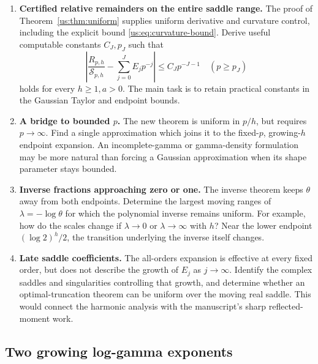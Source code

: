 \documentclass[11pt,a4paper]{article}
\numberwithin{equation}{section}
\theoremstyle{plain}
\theoremstyle{definition}
\theoremstyle{remark}
\begin{document}
\begin{enumerate}[leftmargin=*,label=H\arabic*.]
\item \textbf{Certified relative remainders on the entire saddle
range.} The proof of Theorem~\ref{us:thm:uniform} supplies uniform
derivative and curvature control, including the explicit bound
\eqref{us:eq:curvature-bound}. Derive useful computable constants
$C_J,p_J$ such that
\[
 \left|\frac{R_{p,h}}{\mathcal S_{p,h}}
      -\sum_{j=0}^JE_jp^{-j}\right|
 \le C_Jp^{-J-1}\quad(p\ge p_J)
\]
holds for every $h\ge1,a>0$. The main task is to retain practical
constants in the Gaussian Taylor and endpoint bounds.

\item \textbf{A bridge to bounded $p$.} The new theorem is uniform
in $p/h$, but requires $p\to\infty$. Find a single approximation
which joins it to the fixed-$p$, growing-$h$ endpoint expansion.
An incomplete-gamma or gamma-density formulation may be more
natural than forcing a Gaussian approximation when its shape
parameter stays bounded.

\item \textbf{Inverse fractions approaching zero or one.}
The inverse theorem keeps $\theta$ away from both endpoints.
Determine the largest moving ranges of
$\lambda=-\log\theta$ for which the polynomial inverse remains
uniform. For example, how do the scales change if
$\lambda\to0$ or $\lambda\to\infty$ with $h$? Near the lower
endpoint $(\log2)^h/2$, the transition underlying the inverse
itself changes.

\item \textbf{Late saddle coefficients.} The all-orders expansion
is effective at every fixed order, but does not describe the growth
of $E_j$ as $j\to\infty$. Identify the complex saddles and
singularities controlling that growth, and determine whether an
optimal-truncation theorem can be uniform over the moving real
saddle. This would connect the harmonic analysis with the
manuscript's sharp reflected-moment work.
\end{enumerate}

\subsection{Two growing log-gamma exponents}
\end{document}
